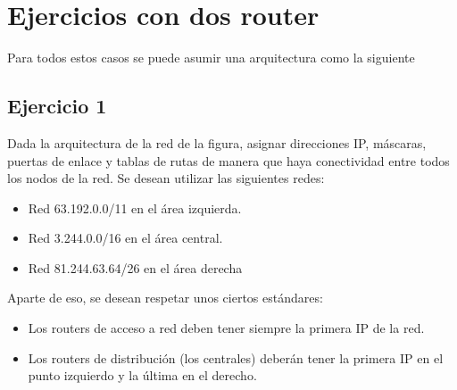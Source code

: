 \documentclass[letterpaper,10pt,spanish]{sphinxmanual}
\begin{document}
\section{Ejercicios con dos router}
\label{\detokenize{t2_integracion_elementos/ejercicios_subredes_ipv4/ejercicios_dos_router:ejercicios-con-dos-router}}
\sphinxAtStartPar
Para todos estos casos se puede asumir una arquitectura como la siguiente


\subsection{Ejercicio 1}
\label{\detokenize{t2_integracion_elementos/ejercicios_subredes_ipv4/ejercicios_dos_router:ejercicio-1}}
\sphinxAtStartPar
Dada la arquitectura de la red de la figura, asignar direcciones IP, máscaras, puertas de enlace y tablas de rutas de manera que haya conectividad entre todos
los nodos de la red. Se desean utilizar las siguientes redes:
\begin{itemize}
\item {} 
\sphinxAtStartPar
Red 63.192.0.0/11 en el área izquierda.

\item {} 
\sphinxAtStartPar
Red 3.244.0.0/16 en el área central.

\item {} 
\sphinxAtStartPar
Red 81.244.63.64/26 en el área derecha

\end{itemize}

\begin{figure}[htbp]
\centering

\noindent{}
\end{figure}

\sphinxAtStartPar
Aparte de eso, se desean respetar unos ciertos estándares:
\begin{itemize}
\item {} 
\sphinxAtStartPar
Los routers de acceso a red deben tener siempre la primera IP de la red.

\item {} 
\sphinxAtStartPar
Los routers de distribución (los centrales) deberán tener la primera IP en el punto izquierdo y la última en el derecho.

\end{itemize}
\end{document}
